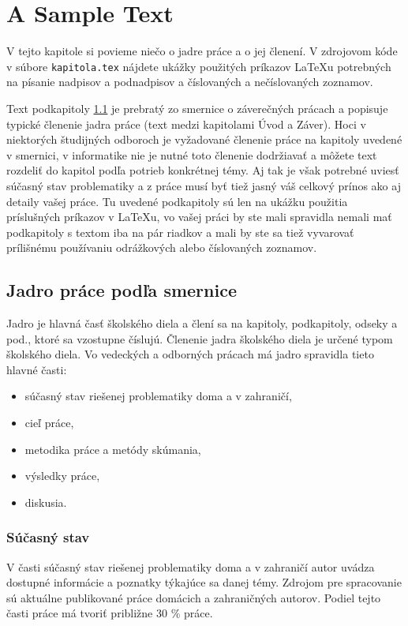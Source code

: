 \chapter{A Sample Text}

\label{kap:clenenie} %

V tejto kapitole si povieme niečo o jadre práce a o jej členení. V
zdrojovom kóde v súbore \verb'kapitola.tex' nájdete ukážky použitých
príkazov LaTeXu potrebných na písanie nadpisov a podnadpisov a
číslovaných a nečíslovaných zoznamov.

Text podkapitoly \ref{sec:jadro} je
prebratý zo smernice o záverečných prácach \cite[článok 5]{smernica} a popisuje typické členenie jadra práce (text medzi kapitolami Úvod a Záver). Hoci v niektorých študijných odboroch je vyžadované členenie práce na kapitoly uvedené v smernici, v informatike nie je nutné toto členenie dodržiavať a môžete text rozdeliť do kapitol podľa potrieb konkrétnej témy. Aj tak je však potrebné uviesť súčasný stav problematiky a z práce musí byť tiež jasný váš celkový prínos ako aj detaily vašej práce. Tu uvedené podkapitoly sú len na ukážku použitia príslušných príkazov v LaTeXu, vo vašej práci by ste mali spravidla nemali mať podkapitoly s textom iba na pár riadkov a mali by ste sa tiež vyvarovať prílišnému používaniu odrážkových alebo číslovaných zoznamov.

\section{Jadro práce podľa smernice}
\label{sec:jadro}
Jadro je hlavná časť školského diela a člení sa na kapitoly,
podkapitoly, odseky a pod., ktoré sa vzostupne číslujú.
Členenie jadra školského diela je určené typom  školského diela. Vo vedeckých 
a odborných prácach má jadro spravidla tieto hlavné časti:
\begin{itemize}
\item  súčasný stav riešenej problematiky doma a v zahraničí,
\item  cieľ práce,
\item  metodika práce a metódy skúmania,
\item  výsledky práce, 
\item  diskusia. 
\end{itemize}

\subsection{Súčasný stav}
V časti súčasný stav riešenej problematiky doma a v zahraničí autor uvádza 
dostupné informácie a poznatky týkajúce sa danej témy. Zdrojom pre spracovanie sú 
aktuálne publikované práce domácich a zahraničných autorov.  Podiel tejto časti práce 
má tvoriť približne 30 \% práce.

